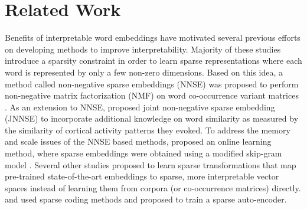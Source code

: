 \documentclass[11pt,a4paper]{article}
\begin{document}



\section{Related Work} \label{sec:related}

Benefits of interpretable word embeddings have motivated several previous efforts on developing methods to improve interpretability. Majority of these studies introduce a sparsity constraint in order to learn sparse representations where each word is represented by only a few non-zero dimensions. 
Based on this idea, a method called non-negative sparse embeddings (NNSE) was proposed to perform non-negative matrix factorization (NMF) on word co-occurrence variant matrices \citep{murphy12nnse}. As an extension to NNSE, \citet{fyshe14interpretable} proposed joint non-negative sparse embedding (JNNSE) to incorporate additional knowledge on word similarity as measured by the similarity of cortical activity patterns they evoked. To address the memory and scale issues of the NNSE based methods, \citet{luo15online} proposed an online learning method, where sparse embeddings were obtained using a modified skip-gram model \citep{mikolov13word2vec_a}. Several other studies proposed to learn sparse transformations that map pre-trained state-of-the-art embeddings to sparse, more interpretable vector spaces instead of learning them from corpora (or co-occurrence matrices) directly. \citet{arora18linalg} and \citet{faruqui15sparse} used sparse coding methods and \citep{subramanian18spine} proposed to train a sparse auto-encoder.
\end{document}
